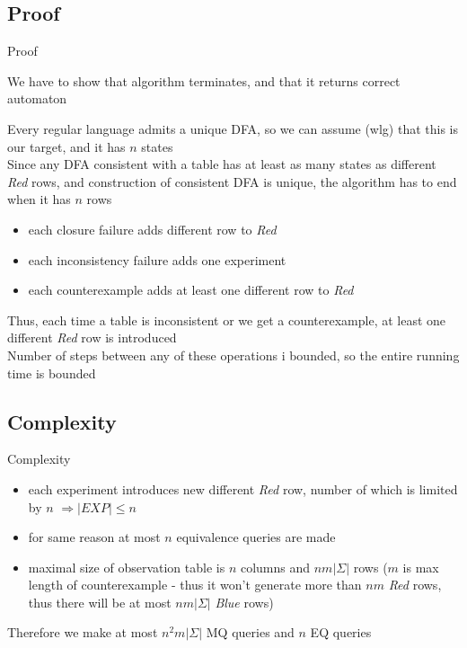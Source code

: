 \documentclass[aspectratio=169,xcolor=dvipsnames]{beamer}
\begin{document}
\subsection{Proof}
\begin{frame}[t]{Proof}


We have to show that algorithm terminates, and that it returns correct automaton \\

\vspace{3mm}

Every regular language admits a unique DFA, so we can assume (wlg) that this is our target, and it has $n$ states \\
Since any DFA consistent with a table has at least as many states as different \textit{Red} rows, and construction of consistent DFA is unique, the algorithm has to end when it has $n$ rows

\begin{itemize}
    \item each closure failure adds different row to \textit{Red}
    \item each inconsistency failure adds one experiment
    \item each counterexample adds at least one different row to \textit{Red}
\end{itemize}
Thus, each time a table is inconsistent or we get a counterexample, at least one different \textit{Red} row is introduced \\
Number of steps between any of these operations i bounded, so the entire running time is bounded

\end{frame}


\subsection{Complexity}
\begin{frame}[t]{Complexity}
\begin{itemize}
    \item each experiment introduces new different \textit{Red} row, number of which is limited by $n$ $\Rightarrow |EXP| \leq n$ 
    \item for same reason at most $n$ equivalence queries are made
    \item maximal size of observation table is $n$ columns and $nm |\Sigma|$ rows ($m$ is max length of counterexample - thus it won't generate more than $nm$ \textit{Red} rows, thus there will be at most $nm |\Sigma|$ \textit{Blue} rows)
\end{itemize}

Therefore we make at most $n^2m |\Sigma|$ MQ queries and $n$ EQ queries
\end{frame}
\end{document}
